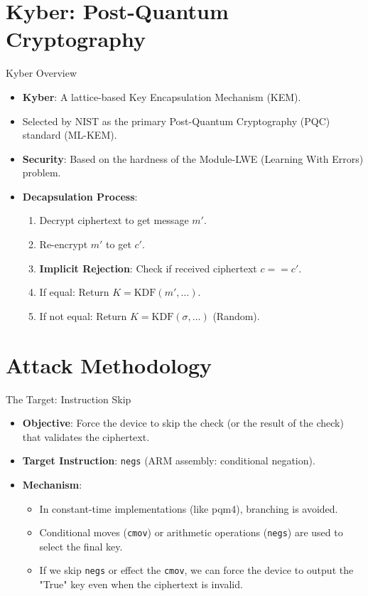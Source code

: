 \documentclass[aspectratio=169]{beamer}
\begin{document}
\section{Kyber: Post-Quantum Cryptography}
\begin{frame}{Kyber Overview}
    \begin{itemize}
        \item \textbf{Kyber}: A lattice-based Key Encapsulation Mechanism (KEM).
        \item Selected by NIST as the primary Post-Quantum Cryptography (PQC) standard (ML-KEM).
        \item \textbf{Security}: Based on the hardness of the Module-LWE (Learning With Errors) problem.
        \item \textbf{Decapsulation Process}:
            \begin{enumerate}
                \item Decrypt ciphertext to get message $m'$.
                \item Re-encrypt $m'$ to get $c'$.
                \item \textbf{Implicit Rejection}: Check if received ciphertext $c == c'$.
                \item If equal: Return $K = \text{KDF}(m', \dots)$.
                \item If not equal: Return $K = \text{KDF}(\sigma, \dots)$ (Random).
            \end{enumerate}
    \end{itemize}
\end{frame}

\section{Attack Methodology}
\begin{frame}{The Target: Instruction Skip}
    \begin{itemize}
        \item \textbf{Objective}: Force the device to skip the check (or the result of the check) that validates the ciphertext.
        \item \textbf{Target Instruction}: \texttt{negs} (ARM assembly: conditional negation).
        \item \textbf{Mechanism}:
            \begin{itemize}
                \item In constant-time implementations (like pqm4), branching is avoided.
                \item Conditional moves (\texttt{cmov}) or arithmetic operations (\texttt{negs}) are used to select the final key.
                \item If we skip \texttt{negs} or effect the \texttt{cmov}, we can force the device to output the "True" key even when the ciphertext is invalid.
            \end{itemize}
    \end{itemize}
\end{frame}
\end{document}
